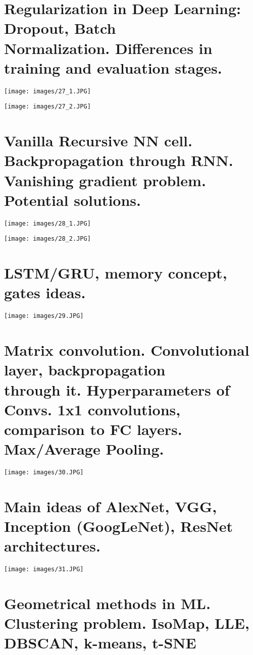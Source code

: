 \section{Regularization in Deep Learning: Dropout, Batch \\ Normalization. Differences in training and evaluation stages.}\label{27}
\texttt{[image: images/27\_1.JPG]}

\texttt{[image: images/27\_2.JPG]}
\newpage

\section{Vanilla Recursive NN cell. Backpropagation through RNN. Vanishing gradient problem. Potential solutions.}
\texttt{[image: images/28\_1.JPG]}

\texttt{[image: images/28\_2.JPG]}
\newpage

\section{LSTM/GRU, memory concept, gates ideas.}
\texttt{[image: images/29.JPG]}
\newpage

\section{Matrix convolution. Convolutional layer, backpropagation \\ through it. Hyperparameters of Convs. 1x1 convolutions, comparison to FC layers. Max/Average Pooling.}
\texttt{[image: images/30.JPG]}
\newpage

\section{Main ideas of AlexNet, VGG, Inception (GoogLeNet), ResNet architectures.}
\texttt{[image: images/31.JPG]}
\newpage

\section{Geometrical methods in ML. Clustering problem. IsoMap, LLE, DBSCAN, k-means, t-SNE}


